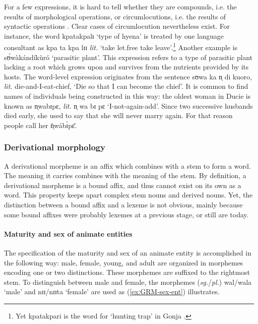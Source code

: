 \begin{exe}
\begin{exe}
\begin{exe}
{\begin{exe}
\begin{exe}
\begin{exe}
\begin{exe}
For a few expressions,  it is hard to tell whether they are compounds, i.e. the
results of  morphological operations, or circumlocutions, i.e.  the results of
syntactic operations \citep[165]{Alla01}. Clear cases of circumlocution
nevertheless exist. For instance,  the word {\sls kpatakpalɪ} `type of hyena'  
is
treated by one language consultant as {\sls kpa ta kpa lɪɪ} {\it lit.}
 `take let.free take leave'.\footnote{Yet {\sls kpatakpari} is the word for
`hunting trap' in Gonja \citep{Rytz66}.}  Another example is {\sls 
sʊ́wàkándíkùró} `parasitic plant'. This expression refers to a type of
parasitic plant lacking a  root which grows upon and survives from the
nutrients provided by its  hosts. The word-level expression originates from the
sentence  {\sls sʊwa ka n̩ di kuoro}, {\it lit.}  die-and-I-eat-chief, `Die so
that I can become the chief'. It is common to find names of individuals being
constructed in this way: the oldest woman in Ducie is known as {\sls n̩wabɪpɛ}, 
{\it lit.}  {\sls n̩ wa bɪ pɛ}  `I-not-again-add'. Since two successive 
husbands 
died early,  she used to say that she will never marry again. For that reason
people call her {\sls ǹ̩wábɪ̀pɛ̄}.  



\subsubsection{Derivational morphology}
\label{sec:GRM-der-morph}

A derivational morpheme is an affix which combines with a stem to form a word.
The meaning it carries combines with the meaning of the stem.  By definition,
a derivational morpheme is a bound affix, and  thus 
cannot exist on its own as a word. This property keeps apart complex
stem nouns and derived nouns. Yet, the distinction between a bound affix and
a lexeme is not obvious, mainly because some bound affixes were probably lexemes
at a previous stage, or still are today. 


\paragraph{Maturity and sex of animate entities}
\label{sec:GRM-der-matur}


The specification of the maturity
and sex of an animate entity is accomplished in the following
way: male, female, young, and adult are organized in morphemes encoding
one or two distinctions. These morphemes are suffixed to the rightmost stem.
To distinguish between male and female, the morphemes ({\it sg.}/{\it pl.}) 
{\sls wal/wala} `male'  and {\sls nɪɪ/nɪɪta} `female'  are used as
(\ref{exːGRM-sex-ent}) illustrates.



\end{exe}
\end{exe}
\end{exe}
\end{exe}}
\end{exe}
\end{exe}
\end{exe}
